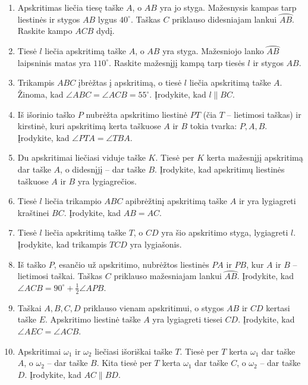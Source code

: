 \documentclass[11pt,a4paper]{scrartcl}
\begin{document}
\begin{enumerate}
    \renewcommand{\labelenumi}{\textbf{\theenumi.}}

    \item Apskritimas liečia tiesę taške $A$, o $AB$ yra jo styga. Mažesnysis kampas tarp liestinės ir stygos $AB$ lygus $40^\circ$. Taškas $C$ priklauso didesniajam lankui $\wideparen{AB}$. Raskite kampo $ACB$ dydį.
    \item Tiesė $l$ liečia apskritimą taške $A$, o $AB$ yra styga. Mažesniojo lanko $\wideparen{AB}$ laipsninis matas yra $110^\circ$. Raskite mažesnįjį kampą tarp tiesės $l$ ir stygos $AB$.
    \item Trikampis $ABC$ įbrėžtas į apskritimą, o tiesė $l$ liečia apskritimą taške $A$. Žinoma, kad $\angle ABC=\angle ACB=55^\circ$. Įrodykite, kad $l\parallel BC$.
    \item Iš išorinio taško $P$ nubrėžta apskritimo liestinė $PT$ (čia $T$ – lietimosi taškas) ir kirstinė, kuri apskritimą kerta taškuose $A$ ir $B$ tokia tvarka: $P,A,B$. Įrodykite, kad $\angle PTA=\angle TBA$.
    \item Du apskritimai liečiasi viduje taške $K$. Tiesė per $K$ kerta mažesnįjį apskritimą dar taške $A$, o didesnįjį – dar taške $B$. Įrodykite, kad apskritimų liestinės taškuose $A$ ir $B$ yra lygiagrečios.
    \item Tiesė $l$ liečia trikampio $ABC$ apibrėžtinį apskritimą taške $A$ ir yra lygiagreti kraštinei $BC$. Įrodykite, kad $AB=AC$.
    \item Tiesė $l$ liečia apskritimą taške $T$, o $CD$ yra šio apskritimo styga, lygiagreti $l$. Įrodykite, kad trikampis $TCD$ yra lygiašonis.
    \item Iš taško $P$, esančio už apskritimo, nubrėžtos liestinės $PA$ ir $PB$, kur $A$ ir $B$ – lietimosi taškai. Taškas $C$ priklauso mažesniajam lankui $\wideparen{AB}$. Įrodykite, kad $\angle ACB=90^\circ+\frac{1}{2}\angle APB$.
    \item Taškai $A,B,C,D$ priklauso vienam apskritimui, o stygos $AB$ ir $CD$ kertasi taške $E$. Apskritimo liestinė taške $A$ yra lygiagreti tiesei $CD$. Įrodykite, kad $\angle AEC=\angle ACB$.
    \item Apskritimai $\omega_1$ ir $\omega_2$ liečiasi išoriškai taške $T$. Tiesė per $T$ kerta $\omega_1$ dar taške $A$, o $\omega_2$ – dar taške $B$. Kita tiesė per $T$ kerta $\omega_1$ dar taške $C$, o $\omega_2$ – dar taške $D$. Įrodykite, kad $AC\parallel BD$.
\end{enumerate}
\end{document}
